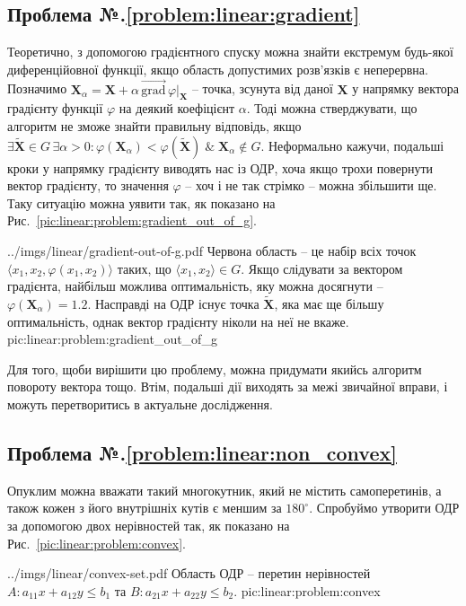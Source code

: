 \documentclass[\main/book.tex]{subfiles}
\begin{document}
\subsection*{Проблема №.\ref{problem:linear:gradient}}

Теоретично, з допомогою градієнтного спуску можна знайти екстремум будь-якої диференційовної функції, якщо область допустимих розв'язків є неперервна. Позначимо $\mathbf{X}_\alpha = \mathbf{X} + \alpha \, \overrightarrow{\textrm{grad}} \, \varphi \Bigr|_\mathbf{X}$ -- точка, зсунута від даної $\mathbf{X}$ у напрямку вектора градієнту функції $\varphi$ на деякий коефіцієнт $\alpha$. Тоді можна стверджувати, що алгоритм не зможе знайти правильну відповідь, якщо $\exists \widetilde{\mathbf{X}} \in G \, \exists \alpha > 0: \varphi(\mathbf{X}_\alpha) < \varphi(\widetilde{\mathbf{X}}) \;\&\; \mathbf{X}_\alpha \notin G$. Неформально кажучи, подальші кроки у напрямку градієнту виводять нас із ОДР, хоча якщо трохи повернути вектор градієнту, то значення $\varphi$ -- хоч і не так стрімко -- можна збільшити ще. Таку ситуацію можна уявити так, як показано на Рис.~\ref{pic:linear:problem:gradient_out_of_g}.

\illustration
 {../imgs/linear/gradient-out-of-g.pdf}
 {Червона область -- це набір всіх точок $\langle x_1, x_2, \varphi(x_1, x_2)\rangle$ таких, що $\langle x_1, x_2 \rangle \in G$. Якщо слідувати за вектором градієнта, найбільш можлива оптимальність, яку можна досягнути -- $\varphi(\mathbf{X}_\alpha)=1.2$. Насправді на ОДР існує точка $\widetilde{\mathbf{X}}$, яка має ще більшу оптимальність, однак вектор градієнту ніколи на неї не вкаже.}
 {pic:linear:problem:gradient_out_of_g}

Для того, щоби вирішити цю проблему, можна придумати якийсь алгоритм повороту вектора тощо. Втім, подальші дії виходять за межі звичайної вправи, і можуть перетворитись в актуальне дослідження.

\subsection*{Проблема №.\ref{problem:linear:non_convex}}

Опуклим можна вважати такий многокутник, який не містить самоперетинів, а також кожен з його внутрішніх кутів є меншим за $180^\circ$. Спробуймо утворити ОДР за допомогою двох нерівностей так, як показано на Рис.~\ref{pic:linear:problem:convex}.

\illustration
 {../imgs/linear/convex-set.pdf}
 {Область ОДР -- перетин нерівностей ${A: a_{11} x + a_{12} y \leq b_1}$ та ${B: a_{21} x + a_{22} y \leq b_2}$.}
 {pic:linear:problem:convex}
\end{document}
